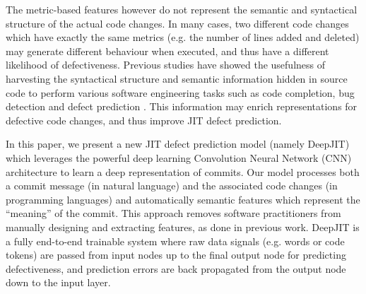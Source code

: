 The metric-based features however do not represent the semantic and syntactical structure of the actual code changes. In many cases, two different code changes which have exactly the same metrics (e.g. the number of lines added and deleted) may generate different behaviour when executed, and thus have a different likelihood of defectiveness. Previous studies have showed the usefulness of harvesting the syntactical structure and semantic information hidden in source code to perform various software engineering tasks such as code completion, bug detection and defect prediction \cite{Wang:2016:ALS,Tu:2014:LS,Nguyen:2015:GSL,Hindle:2012:NS,Li:2005:PAE}. This information may enrich representations for defective code changes, and thus improve JIT defect prediction.

In this paper, we present a new JIT defect prediction model (namely DeepJIT) which leverages the powerful deep learning Convolution Neural Network (CNN) architecture to learn a deep representation of commits. Our model processes both a commit message (in natural language) and the associated code changes (in programming languages) and automatically semantic features which represent the ``meaning'' of the commit. This approach removes software practitioners from manually designing and extracting features, as done in previous work. DeepJIT is a fully end-to-end trainable system where raw data signals (e.g. words or code tokens) are passed from input nodes up to the final output node for predicting defectiveness, and prediction errors are back propagated from the output node down to the input layer.
